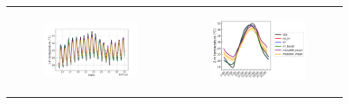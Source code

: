 \begin{figure}[hbtp]
\begin{tabular}{cc}
        \begin{subfigure}[t]{0.5\textwidth}
            \caption{}
            \includegraphics[width=\textwidth]{images/chap5/SOP_TS_DC/time_series_elsplans_t2m.png}
        \end{subfigure} &
        \begin{subfigure}[t]{0.5\textwidth}
            \caption{}
            \includegraphics[width=\textwidth]{images/chap5/SOP_TS_DC/diurnal_cycle_elsplans_t2m.png}
        \end{subfigure} \\
        

\end{tabular}
\end{figure}
